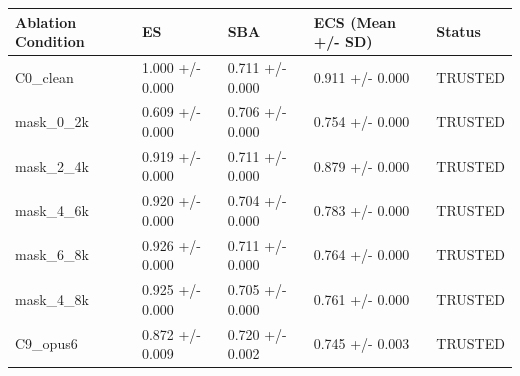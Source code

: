 \begin{tabular}{lllll}
\toprule
Ablation Condition & ES & SBA & ECS (Mean +/- SD) & Status \\
\midrule
C0_clean & 1.000 +/- 0.000 & 0.711 +/- 0.000 & 0.911 +/- 0.000 & TRUSTED \\
mask_0_2k & 0.609 +/- 0.000 & 0.706 +/- 0.000 & 0.754 +/- 0.000 & TRUSTED \\
mask_2_4k & 0.919 +/- 0.000 & 0.711 +/- 0.000 & 0.879 +/- 0.000 & TRUSTED \\
mask_4_6k & 0.920 +/- 0.000 & 0.704 +/- 0.000 & 0.783 +/- 0.000 & TRUSTED \\
mask_6_8k & 0.926 +/- 0.000 & 0.711 +/- 0.000 & 0.764 +/- 0.000 & TRUSTED \\
mask_4_8k & 0.925 +/- 0.000 & 0.705 +/- 0.000 & 0.761 +/- 0.000 & TRUSTED \\
C9_opus6 & 0.872 +/- 0.009 & 0.720 +/- 0.002 & 0.745 +/- 0.003 & TRUSTED \\
\bottomrule
\end{tabular}
